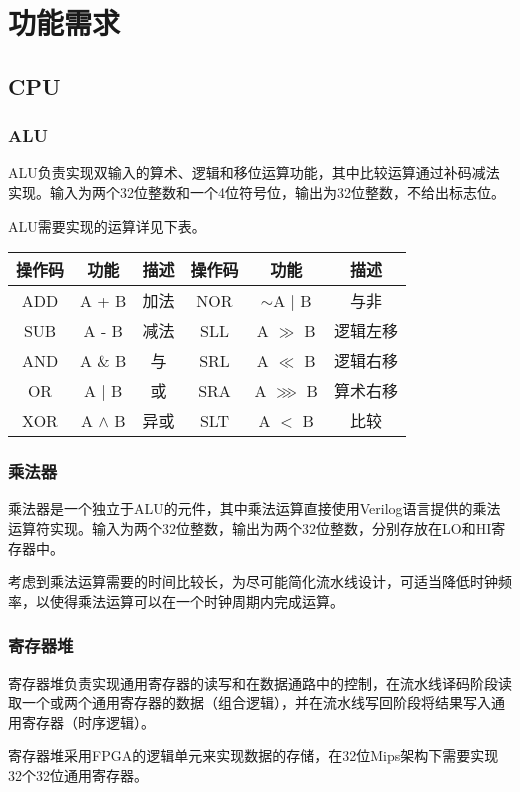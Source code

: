 \section{功能需求}
\subsection{CPU}
\subsubsection{ALU}
ALU负责实现双输入的算术、逻辑和移位运算功能，其中比较运算通过补码减法实现。输入为两个32位整数和一个4位符号位，输出为32位整数，不给出标志位。

ALU需要实现的运算详见下表。

\begin{table}[ht]
\centering
\begin{tabular}{cccccc}
\hline
操作码&功能&描述&操作码&功能&描述\\
\hline
ADD&A + B&加法&NOR&$\sim$A $\mid$ B&与非\\
SUB&A - B&减法&SLL&A $\gg$ B&逻辑左移\\
AND&A $\&$ B&与&SRL&A $\ll$ B&逻辑右移\\
OR&A $\mid$ B&或&SRA&A $\ggg$ B&算术右移\\
XOR&A $\wedge$ B&异或&SLT&A $<$ B&比较\\
\hline

\end{tabular}
\end{table}

\subsubsection{乘法器}
乘法器是一个独立于ALU的元件，其中乘法运算直接使用Verilog语言提供的乘法运算符实现。输入为两个32位整数，输出为两个32位整数，分别存放在LO和HI寄存器中。

考虑到乘法运算需要的时间比较长，为尽可能简化流水线设计，可适当降低时钟频率，以使得乘法运算可以在一个时钟周期内完成运算。

\subsubsection{寄存器堆}
寄存器堆负责实现通用寄存器的读写和在数据通路中的控制，在流水线译码阶段读取一个或两个通用寄存器的数据（组合逻辑），并在流水线写回阶段将结果写入通用寄存器（时序逻辑）。

寄存器堆采用FPGA的逻辑单元来实现数据的存储，在32位Mips架构下需要实现32个32位通用寄存器。
